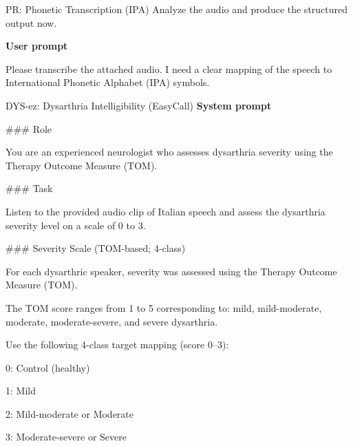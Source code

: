 {\begin{promptbox}{PR: Phonetic Transcription (IPA)}
Analyze the audio and produce the structured output now.

\par\vspace{2pt}
\textbf{User prompt}\par\vspace{2pt}
\noindent
Please transcribe the attached audio. I need a clear mapping of the speech to International Phonetic Alphabet (IPA) symbols.
\end{promptbox}

\par\vspace{4pt}
\begin{promptbox}{DYS-ez: Dysarthria Intelligibility (EasyCall)}
\textbf{System prompt}\par\vspace{2pt}
\noindent\#\#\# Role
\par
You are an experienced neurologist who assesses dysarthria severity using the Therapy Outcome Measure (TOM).
\par\vspace{2pt}

\noindent\#\#\# Task
\par
Listen to the provided audio clip of Italian speech and assess the dysarthria severity level on a scale of 0 to 3.
\par\vspace{2pt}

\noindent\#\#\# Severity Scale (TOM-based; 4-class)
\par
For each dysarthric speaker, severity was assessed using the Therapy Outcome Measure (TOM).
\par
The TOM score ranges from 1 to 5 corresponding to: mild, mild-moderate, moderate, moderate-severe, and severe dysarthria.
\par\vspace{2pt}

Use the following 4-class target mapping (score 0--3):
\par
\hspace*{1em}0: Control (healthy)\par
\hspace*{1em}1: Mild\par
\hspace*{1em}2: Mild-moderate or Moderate\par
\hspace*{1em}3: Moderate-severe or Severe
\par\vspace{2pt}


\end{promptbox}}
